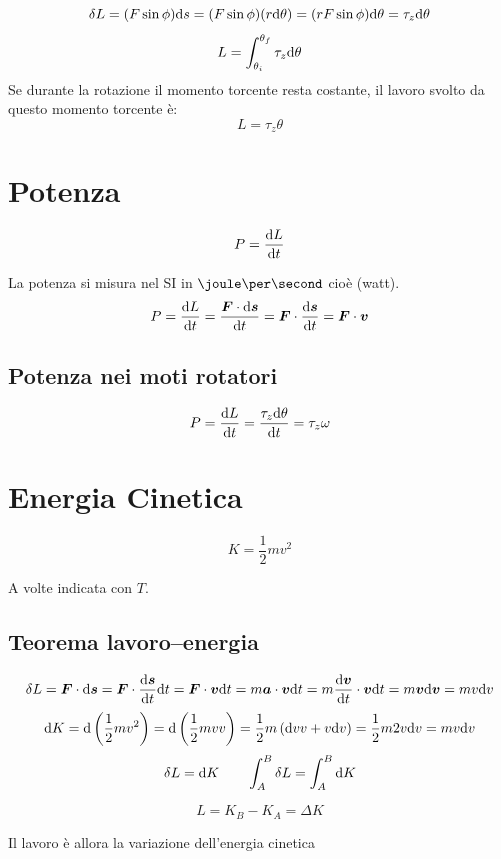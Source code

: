 $$\delta L=(F\sin \phi)\mathrm{d} s=(F \sin \phi)(r
\mathrm{d}\theta)=(rF\sin\phi)\mathrm{d} \theta=\tau_z\mathrm{d}\theta$$
\begin{equation*}L=\int_{\theta_i}^{\theta_f}\tau_z\mathrm{d}\theta\end{equation*}
Se durante la rotazione il momento torcente resta costante, il
lavoro svolto da questo momento torcente è:
\begin{equation*}L=\tau_z\theta\end{equation*}
\section{Potenza}
\begin{Def}[potenza]
 \begin{equation*}P=\frac{\mathrm{d} L}{\mathrm{d} t}\end{equation*}
\end{Def}
La potenza si misura nel SI in $\joule\per\second$ cioè \watt(watt).
$$P=\frac{\mathrm{d} L}{\mathrm{d} t}=\frac{\boldsymbol{F}\cdot\mathrm{d} \boldsymbol{s}}{\mathrm{d} t}=\boldsymbol{F}\cdot\frac{\mathrm{d} \boldsymbol{s}}{\mathrm{d}
t}=\boldsymbol{F}\cdot \boldsymbol{v}$$
\subsection{Potenza nei moti rotatori}
$$P=\frac{\mathrm{d} L}{\mathrm{d} t}=\frac{\tau_z\mathrm{d}\theta}{\mathrm{d}
t}=\tau_z\omega$$

\section[Energia Cinetica]{Energia Cinetica}
\begin{Def}
\begin{equation*}K=\frac{1}{2}mv^2\end{equation*}
\end{Def}
A volte indicata con $T$.
\subsection{Teorema lavoro--energia}
\begin{equation*}\delta L=\boldsymbol{F}\cdot\mathrm{d} \boldsymbol{s}=\boldsymbol{F}\cdot\frac{\mathrm{d} \boldsymbol{s}}{\mathrm{d} t}\mathrm{d} t=\boldsymbol{F}\cdot\boldsymbol{v}\mathrm{d} t=m\boldsymbol{a}\cdot\boldsymbol{v}\mathrm{d} t=m\frac{\mathrm{d} \boldsymbol{v}}{\mathrm{d} t}\cdot\boldsymbol{v}\mathrm{d} t=m\boldsymbol{v}\mathrm{d} \boldsymbol{v}=mv\mathrm{d} v\end{equation*}
\begin{equation*}\mathrm{d} K=\mathrm{d} \left(\frac{1}{2}mv^2\right)=\mathrm{d} \left(\frac{1}{2}mvv\right)=\frac{1}{2}m\left(\mathrm{d} vv+v\mathrm{d} v\right)=\frac{1}{2}m2v\mathrm{d} v=mv\mathrm{d} v\end{equation*}
\begin{equation*}\delta L=\mathrm{d} K\qquad\int_A^B\delta L=\int_A^B \mathrm{d} K\end{equation*}
\begin{Teo}
\begin{equation*}L=K_B-K_A=\Delta K\end{equation*}
\end{Teo}
Il lavoro è allora la variazione dell'energia cinetica


